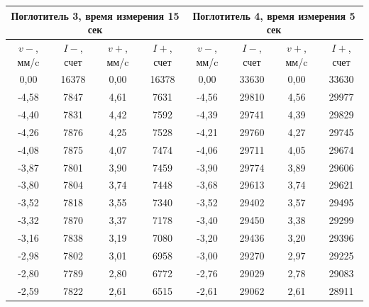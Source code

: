 \documentclass[a4paper,12pt]{article}
\theoremstyle{definition}
\begin{document}
\begin{table}[h]
\begin{tabular}{|c|c|c|c|c|c|c|c|}
\hline
\multicolumn{4}{|c|}{Поглотитель   3, время измерения 15 сек} & \multicolumn{4}{c|}{Поглотитель   4, время измерения 5 сек} \\ \hline
$v-$, мм/c    & $I-$, счет    & $v+$, мм/c    & $I+$, счет    & $v-$, мм/c    & $I-$, счет    & $v+$, мм/c   & $I+$, счет   \\ \hline
0,00          & 16378         & 0,00          & 16378         & 0,00          & 33630         & 0,00         & 33630        \\ \hline
-4,58         & 7847          & 4,61          & 7631          & -4,56         & 29810         & 4,56         & 29977        \\ \hline
-4,40         & 7831          & 4,42          & 7592          & -4,39         & 29741         & 4,39         & 29829        \\ \hline
-4,26         & 7876          & 4,25          & 7528          & -4,21         & 29760         & 4,27         & 29745        \\ \hline
-4,08         & 7875          & 4,07          & 7474          & -4,06         & 29711         & 4,05         & 29674        \\ \hline
-3,87         & 7801          & 3,90          & 7459          & -3,90         & 29774         & 3,89         & 29606        \\ \hline
-3,80         & 7804          & 3,74          & 7448          & -3,68         & 29613         & 3,74         & 29621        \\ \hline
-3,52         & 7818          & 3,55          & 7340          & -3,52         & 29402         & 3,57         & 29495        \\ \hline
-3,32         & 7870          & 3,37          & 7178          & -3,40         & 29450         & 3,38         & 29299        \\ \hline
-3,16         & 7838          & 3,19          & 7080          & -3,20         & 29436         & 3,20         & 29396        \\ \hline
-2,98         & 7802          & 3,01          & 6958          & -3,00         & 29270         & 2,97         & 29225        \\ \hline
-2,80         & 7789          & 2,80          & 6772          & -2,76         & 29029         & 2,78         & 29083        \\ \hline
-2,59         & 7822          & 2,61          & 6515          & -2,61         & 29062         & 2,61         & 28911        \\ \hline

\end{tabular}
\end{table}
\end{document}
